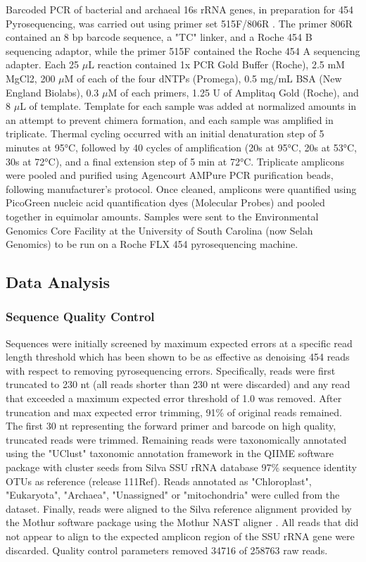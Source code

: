 Barcoded PCR of bacterial and archaeal 16s rRNA genes, in preparation for 454 Pyrosequencing, was carried out using primer set 515F/806R \cite{21349862}. The primer 806R contained an 8 bp barcode sequence, a "TC" linker, and a Roche 454 B sequencing adaptor, while the primer 515F contained the Roche 454 A sequencing adapter. Each 25 $\mu$L reaction contained 1x PCR Gold Buffer (Roche), 2.5 mM MgCl2, 200 $\mu$M of each of the four dNTPs (Promega), 0.5 mg/mL BSA (New England Biolabs), 0.3 $\mu$M of each primers, 1.25 U of Amplitaq Gold (Roche), and 8 $\mu$L of template. Template for each sample was added at normalized amounts in an attempt to prevent chimera formation, and each sample was amplified in triplicate. Thermal cycling occurred with an initial denaturation step of 5 minutes at 95°C, followed by 40 cycles of amplification (20s at 95°C, 20s at 53°C, 30s at 72°C), and a final extension step of 5 min at 72°C. Triplicate amplicons were pooled and purified using Agencourt AMPure PCR purification beads, following manufacturer’s protocol. Once cleaned, amplicons were quantified using PicoGreen nucleic acid quantification dyes (Molecular Probes) and pooled together in equimolar amounts. Samples were sent to the Environmental Genomics Core Facility at the University of South Carolina (now Selah Genomics) to be run on a Roche FLX 454 pyrosequencing machine. 

\subsection{Data Analysis} 

\subsubsection{Sequence Quality Control} Sequences were initially screened by maximum expected errors at a specific read length threshold \cite{23955772} which has been shown to be as effective as denoising 454 reads with respect to removing pyrosequencing errors. Specifically, reads were first truncated to 230 nt (all reads shorter than 230 nt were discarded) and any read that exceeded a maximum expected error threshold of 1.0 was removed. After truncation and max expected error trimming, 91\% of original reads remained. The first 30 nt representing the forward primer and barcode on high quality, truncated reads were trimmed. Remaining reads were taxonomically annotated using the "UClust" taxonomic annotation framework in the QIIME software package \cite{20383131, 20709691} with cluster seeds from Silva SSU rRNA database \cite{17947321} 97\% sequence identity OTUs as reference (release 111Ref). Reads annotated as "Chloroplast", "Eukaryota", "Archaea", "Unassigned" or "mitochondria" were culled from the dataset. Finally, reads were aligned to the Silva reference alignment provided by the Mothur software package \cite{19801464} using the Mothur NAST aligner \cite{16845035}. All reads that did not appear to align to the expected amplicon region of the SSU rRNA gene were discarded. Quality control parameters removed 34716 of 258763 raw reads.

